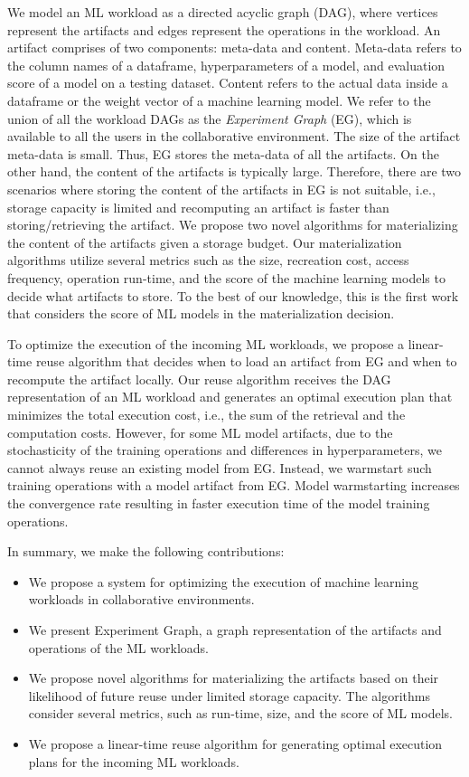 We model an ML workload as a directed acyclic graph (DAG), where vertices represent the artifacts and edges represent the operations in the workload.
An artifact comprises of two components: meta-data and content.
Meta-data refers to the column names of a dataframe, hyperparameters of a model, and evaluation score of a model on a testing dataset.
Content refers to the actual data inside a dataframe or the weight vector of a machine learning model.
We refer to the union of all the workload DAGs as the \textit{Experiment Graph} (EG), which is available to all the users in the collaborative environment.
The size of the artifact meta-data is small.
Thus, EG stores the meta-data of all the artifacts.
On the other hand, the content of the artifacts is typically large.
Therefore, there are two scenarios where storing the content of the artifacts in EG is not suitable, i.e., storage capacity is limited and recomputing an artifact is faster than storing/retrieving the artifact.
We propose two novel algorithms for materializing the content of the artifacts given a storage budget.
Our materialization algorithms utilize several metrics such as the size, recreation cost, access frequency, operation run-time, and the score of the machine learning models to decide what artifacts to store.
To the best of our knowledge, this is the first work that considers the score of ML models in the materialization decision.

To optimize the execution of the incoming ML workloads, we propose a linear-time reuse algorithm that decides when to load an artifact from EG and when to recompute the artifact locally.
Our reuse algorithm receives the DAG representation of an ML workload and generates an optimal execution plan that minimizes the total execution cost, i.e., the sum of the retrieval and the computation costs.
However, for some ML model artifacts, due to the stochasticity of the training operations and differences in hyperparameters, we cannot always reuse an existing model from EG.
Instead, we warmstart such training operations with a model artifact from EG.
Model warmstarting increases the convergence rate resulting in faster execution time of the model training operations.

In summary, we make the following contributions:
\begin{itemize}
\item We propose a system for optimizing the execution of machine learning workloads in collaborative environments.
\item We present Experiment Graph, a graph representation of the artifacts and operations of the ML workloads.
\item We propose novel algorithms for materializing the artifacts based on their likelihood of future reuse under limited storage capacity. The algorithms consider several metrics, such as run-time, size, and the score of ML models.
\item We propose a linear-time reuse algorithm for generating optimal execution plans for the incoming ML workloads.
\end{itemize}

